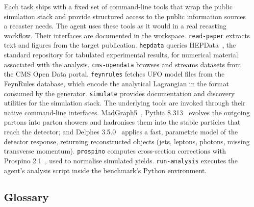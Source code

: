 \documentclass{article}
\begin{document}
Each task ships with a fixed set of command-line tools that wrap the public simulation stack and provide structured access to the public information sources a recaster needs. The agent uses these tools as it would in a real recasting workflow. Their interfaces are documented in the workspace. \texttt{read-paper} extracts text and figures from the target publication. \texttt{hepdata} queries HEPData~\citep{Maguire:2017ypu}, the standard repository for tabulated experimental results, for numerical material associated with the analysis. \texttt{cms-opendata} browses and streams datasets from the CMS Open Data portal. \texttt{feynrules} fetches UFO model files from the FeynRules database, which encode the analytical Lagrangian in the format consumed by the generator. \texttt{simulate} provides documentation and discovery utilities for the simulation stack. The underlying tools are invoked through their native command-line interfaces. MadGraph5~\citep{Alwall:2014hca}, Pythia 8.313~\citep{Bierlich:2022pfr} evolves the outgoing partons into parton showers and hadronises them into the stable particles that reach the detector; and Delphes 3.5.0~\citep{deFavereau:2013fsa} applies a fast, parametric model of the detector response, returning reconstructed objects (jets, leptons, photons, missing transverse momentum). \texttt{prospino} computes cross-section corrections with Prospino 2.1~\citep{Beenakker:1996ch}, used to normalise simulated yields. \texttt{run-analysis} executes the agent's analysis script inside the benchmark's Python environment.

\subsection{Glossary}
\end{document}
